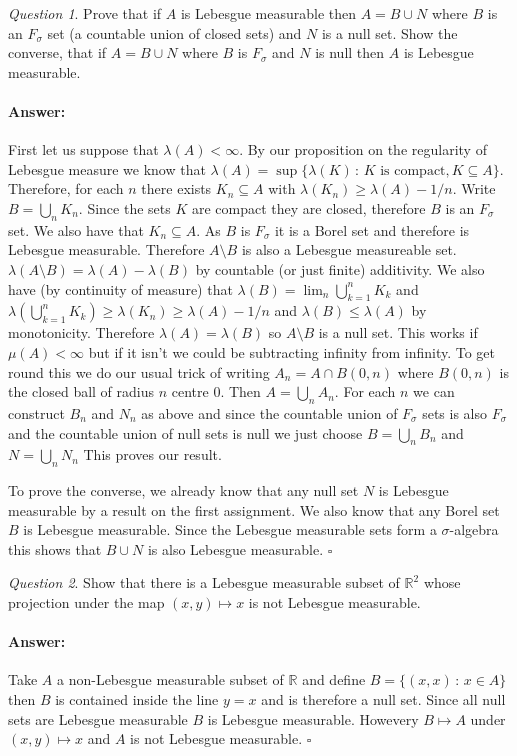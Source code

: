\documentclass[11pt]{article}
\theoremstyle{definition}
\theoremstyle{remark}
\newtheorem{q}{Question}
\newenvironment{ans}{\paragraph{Answer:}}{\hfill$\square$}
\begin{document}
\begin{q}
Prove that if $A$ is Lebesgue measurable then $A= B \cup N$ where $B$ is an $F_\sigma$ set (a countable union of closed sets) and $N$ is a null set. Show the converse, that if $A = B \cup N$ where $B$ is $F_\sigma$ and $N$ is null then $A$ is Lebesgue measurable.
\end{q}
\begin{ans}
First let us suppose that $\lambda(A) < \infty$. By our proposition on the regularity of Lebesgue measure we know that $\lambda(A) = \sup \{ \lambda(K)\,:\, \mbox{$K$ is compact}, K \subseteq A\}$. Therefore, for each $n$ there exists $K_n \subseteq A$ with $\lambda(K_n) \geq \lambda(A) - 1/n$. Write $B= \bigcup_n K_n$. Since the sets $K$ are compact they are closed, therefore $B$ is an $F_\sigma$ set. We also have that $K_n \subseteq A$. As $B$ is $F_\sigma$ it is a Borel set and therefore is Lebesgue measurable. Therefore $A \setminus B$ is also a Lebesgue measureable set. $\lambda(A \setminus B) = \lambda(A) - \lambda(B)$ by countable (or just finite) additivity. We also have (by continuity of measure) that $\lambda(B) = \lim_n \bigcup_{k=1}^n K_k$ and $\lambda(\bigcup_{k=1}^n K_k) \geq \lambda(K_n) \geq \lambda(A) - 1/n$ and $\lambda(B) \leq \lambda(A)$ by monotonicity. Therefore $\lambda(A) = \lambda(B)$ so $A\setminus B$ is a null set. This works if $\mu(A)< \infty$ but if it isn't we could be subtracting infinity from infinity. To get round this we do our usual trick of writing $A_n = A \cap B(0,n)$ where $B(0,n)$ is the closed ball of radius $n$ centre $0$. Then $A = \bigcup_n A_n$. For each $n$ we can construct $B_n$ and $N_n$ as above and since the countable union of $F_\sigma$ sets is also $F_\sigma$ and the countable union of null sets is null we just choose $B= \bigcup_n B_n$ and $N= \bigcup_n N_n$ This proves our result.

To prove the converse, we already know that any null set $N$ is Lebesgue measurable by a result on the first assignment. We also know that any Borel set $B$ is Lebesgue measurable. Since the Lebesgue measurable sets form a $\sigma$-algebra this shows that $B \cup N$ is also Lebesgue measurable.
\end{ans}

\begin{q}
Show that there is a Lebesgue measurable subset of $\mathbb{R}^2$ whose projection under the map $(x,y) \mapsto x$ is not Lebesgue measurable.
\end{q}
\begin{ans}
Take $A$ a non-Lebesgue measurable subset of $\mathbb{R}$ and define $B = \{(x,x) \,:\, x \in A\}$ then $B$ is contained inside the line $y=x$ and is therefore a null set. Since all null sets are Lebesgue measurable $B$ is Lebesgue measurable. Howevery $B \mapsto A$ under $(x,y) \mapsto x$ and $A$ is not Lebesgue measurable.
\end{ans}
\end{document}
